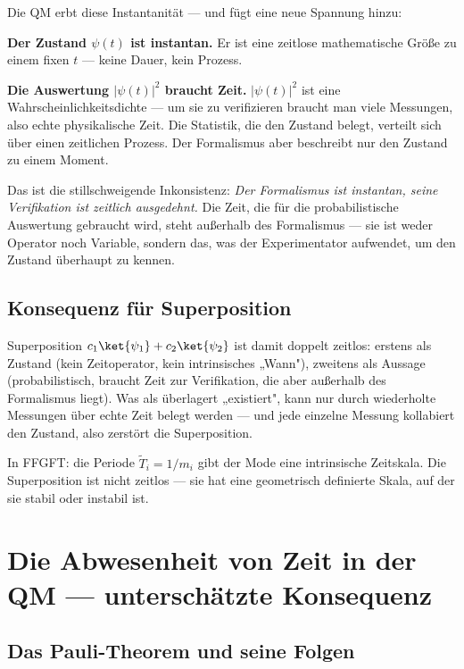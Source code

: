Die QM erbt diese Instantanität — und fügt eine neue Spannung
hinzu:

\textbf{Der Zustand $\psi(t)$ ist instantan.} Er ist eine
zeitlose mathematische Größe zu einem fixen $t$ — keine Dauer,
kein Prozess.

\textbf{Die Auswertung $|\psi(t)|^2$ braucht Zeit.}
$|\psi(t)|^2$ ist eine Wahrscheinlichkeitsdichte — um sie zu
verifizieren braucht man viele Messungen, also echte
physikalische Zeit. Die Statistik, die den Zustand belegt,
verteilt sich über einen zeitlichen Prozess. Der Formalismus
aber beschreibt nur den Zustand zu einem Moment.

Das ist die stillschweigende Inkonsistenz: \emph{Der Formalismus
ist instantan, seine Verifikation ist zeitlich ausgedehnt.}
Die Zeit, die für die probabilistische Auswertung gebraucht
wird, steht außerhalb des Formalismus — sie ist weder
Operator noch Variable, sondern das, was der Experimentator
aufwendet, um den Zustand überhaupt zu kennen.

\subsection{Konsequenz für Superposition}

Superposition $c_1\ket{\psi_1}+c_2\ket{\psi_2}$ ist damit
doppelt zeitlos: erstens als Zustand (kein Zeitoperator,
kein intrinsisches „Wann"), zweitens als Aussage
(probabilistisch, braucht Zeit zur Verifikation, die aber
außerhalb des Formalismus liegt). Was als überlagert
„existiert", kann nur durch wiederholte Messungen über
echte Zeit belegt werden — und jede einzelne Messung kollabiert
den Zustand, also zerstört die Superposition.

In FFGFT: die Periode $\tilde{T}_i = 1/m_i$ gibt der Mode
eine intrinsische Zeitskala. Die Superposition ist nicht
zeitlos — sie hat eine geometrisch definierte Skala, auf der
sie stabil oder instabil ist.

\section{Die Abwesenheit von Zeit in der QM — unterschätzte Konsequenz}

\subsection{Das Pauli-Theorem und seine Folgen}

